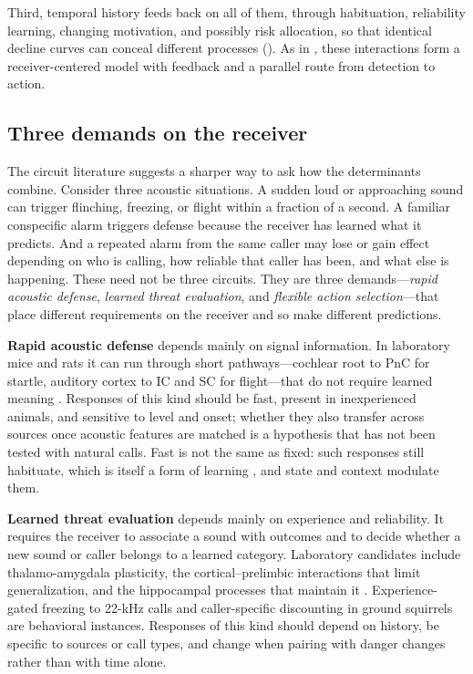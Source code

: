 Third, temporal history feeds back on all of them, through habituation, reliability learning, changing motivation, and possibly risk allocation, so that identical decline curves can conceal different processes (). As in , these interactions form a receiver-centered model with feedback and a parallel route from detection to action.

\subsection{Three demands on the receiver}
\label{sec:account-demands}

The circuit literature suggests a sharper way to ask how the determinants combine. Consider three acoustic situations. A sudden loud or approaching sound can trigger flinching, freezing, or flight within a fraction of a second. A familiar conspecific alarm triggers defense because the receiver has learned what it predicts. And a repeated alarm from the same caller may lose or gain effect depending on who is calling, how reliable that caller has been, and what else is happening. These need not be three circuits. They are three demands---\emph{rapid acoustic defense}, \emph{learned threat evaluation}, and \emph{flexible action selection}---that place different requirements on the receiver and so make different predictions.

\textbf{Rapid acoustic defense} depends mainly on signal information. In laboratory mice and rats it can run through short pathways---cochlear root to PnC for startle, auditory cortex to IC and SC for flight---that do not require learned meaning \citep{DavisEtAl1982,LeeEtAl1996,XiongEtAl2015,LiEtAl2021}. Responses of this kind should be fast, present in inexperienced animals, and sensitive to level and onset; whether they also transfer across sources once acoustic features are matched is a hypothesis that has not been tested with natural calls. Fast is not the same as fixed: such responses still habituate, which is itself a form of learning \citep{RankinEtAl2009}, and state and context modulate them.

\textbf{Learned threat evaluation} depends mainly on experience and reliability. It requires the receiver to associate a sound with outcomes and to decide whether a new sound or caller belongs to a learned category. Laboratory candidates include thalamo-amygdala plasticity, the cortical--prelimbic interactions that limit generalization, and the hippocampal processes that maintain it \citep{LeDouxEtAl1984,QuirkEtAl1995,ConcinaEtAl2018,QuinnEtAl2009}. Experience-gated freezing to 22-kHz calls \citep{KimEtAl2010} and caller-specific discounting in ground squirrels \citep{HareAtkins2001} are behavioral instances. Responses of this kind should depend on history, be specific to sources or call types, and change when pairing with danger changes rather than with time alone.

